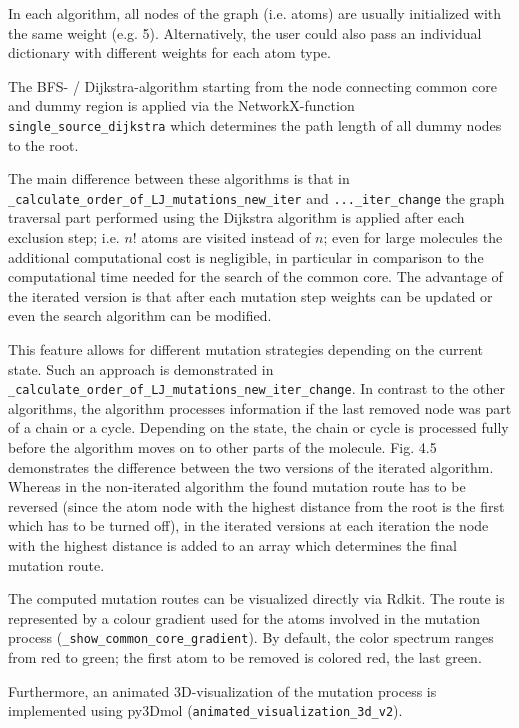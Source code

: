 In each algorithm, all nodes of the graph (i.e. atoms) are usually
initialized with the same weight (e.g. 5). Alternatively, the user
could also pass an individual dictionary with different weights for
each atom type.

The BFS- / Dijkstra-algorithm starting from the node connecting common
core and dummy region is applied via the NetworkX-function \texttt{single\_source\_dijkstra}
which determines the path length of all dummy nodes to the root.

The main difference between these algorithms is that in \texttt{\_calculate\_order\_of\_LJ\_mutations\_new\_iter}
and \texttt{...\_iter\_change} the graph traversal part performed
using the Dijkstra algorithm is applied after each exclusion step; i.e. $n!$ atoms are visited instead of $n$; even for large molecules the additional computational cost is negligible, in particular in comparison
to the computational time needed for the search of the common core.
The advantage of the iterated version is that after each mutation step weights can be
updated or even the search algorithm can be modified. 

This feature allows for different mutation strategies depending
on the current state. Such an approach is demonstrated in \texttt{\_calculate\_order\_of\_LJ\_mutations\_new\_iter\_change}.
In contrast to the other algorithms, the algorithm processes information
if the last removed node was part of a chain or a cycle. Depending
on the state, the chain or cycle is processed fully before the algorithm
moves on to other parts of the molecule. Fig. 4.5 demonstrates the difference between the two versions of the iterated algorithm.
Whereas in the non-iterated algorithm the found mutation route has to be reversed (since the atom node with the highest distance from the root is the first which has to be turned off), in the iterated versions at each iteration the node with the highest distance is added to an array which determines the final mutation route.

The computed mutation routes can be visualized directly via Rdkit. 
The route is represented by a colour gradient used for the atoms involved
in the mutation process (\texttt{\_show\_common\_core\_gradient}). By default, the color spectrum ranges from red to green; the first atom to be removed is colored red, the last green.

Furthermore, an animated 3D-visualization of the mutation process
is implemented using py3Dmol (\texttt{animated\_visualization\_3d\_v2})\cite{key-4}. 

